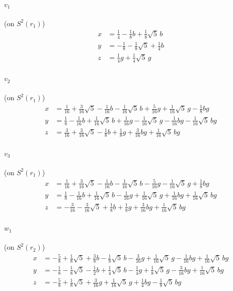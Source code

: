 \documentclass[11pt]{article}
\theoremstyle{remark}
\begin{document}
{\small
\paragraph{$v_{1}$} (on $S^2(r_1)$)
\begin{align*}
x&=\tfrac{1}{4}-\tfrac{1}{8}b+\tfrac{1}{8}\sqrt5\,b\\
y&=-\tfrac{1}{8}-\tfrac{1}{8}\sqrt5+\tfrac{1}{4}b\\
z&=\tfrac{1}{4}g+\tfrac{1}{4}\sqrt5\,g
\end{align*}

\paragraph{$v_{2}$} (on $S^2(r_1)$)
\begin{align*}
x&=\tfrac{1}{16}+\tfrac{3}{16}\sqrt5-\tfrac{1}{16}b-\tfrac{1}{16}\sqrt5\,b+\tfrac{5}{16}g+\tfrac{1}{16}\sqrt5\,g-\tfrac{1}{8}bg\\
y&=\tfrac{1}{8}-\tfrac{1}{16}b+\tfrac{1}{16}\sqrt5\,b+\tfrac{1}{16}g-\tfrac{1}{16}\sqrt5\,g-\tfrac{1}{16}bg-\tfrac{1}{16}\sqrt5\,bg\\
z&=\tfrac{3}{16}+\tfrac{3}{16}\sqrt5-\tfrac{1}{8}b+\tfrac{1}{8}g+\tfrac{3}{16}bg+\tfrac{1}{16}\sqrt5\,bg
\end{align*}

\paragraph{$v_{3}$} (on $S^2(r_1)$)
\begin{align*}
x&=\tfrac{1}{16}+\tfrac{3}{16}\sqrt5-\tfrac{1}{16}b-\tfrac{1}{16}\sqrt5\,b-\tfrac{5}{16}g-\tfrac{1}{16}\sqrt5\,g+\tfrac{1}{8}bg\\
y&=\tfrac{1}{8}-\tfrac{1}{16}b+\tfrac{1}{16}\sqrt5\,b-\tfrac{1}{16}g+\tfrac{1}{16}\sqrt5\,g+\tfrac{1}{16}bg+\tfrac{1}{16}\sqrt5\,bg\\
z&=-\tfrac{3}{16}-\tfrac{3}{16}\sqrt5+\tfrac{1}{8}b+\tfrac{1}{8}g+\tfrac{3}{16}bg+\tfrac{1}{16}\sqrt5\,bg
\end{align*}

\paragraph{$w_{1}$} (on $S^2(r_2)$)
\begin{align*}
x&=-\tfrac{5}{8}+\tfrac{1}{8}\sqrt5+\tfrac{3}{8}b-\tfrac{1}{8}\sqrt5\,b-\tfrac{3}{16}g+\tfrac{1}{16}\sqrt5\,g-\tfrac{1}{16}bg+\tfrac{1}{16}\sqrt5\,bg\\
y&=-\tfrac{1}{8}-\tfrac{1}{8}\sqrt5-\tfrac{1}{2}b+\tfrac{1}{4}\sqrt5\,b-\tfrac{1}{4}g+\tfrac{1}{8}\sqrt5\,g-\tfrac{3}{16}bg+\tfrac{1}{16}\sqrt5\,bg\\
z&=-\tfrac{5}{8}+\tfrac{1}{8}\sqrt5+\tfrac{3}{16}g+\tfrac{1}{16}\sqrt5\,g+\tfrac{1}{4}bg-\tfrac{1}{8}\sqrt5\,bg
\end{align*}

}
\end{document}
